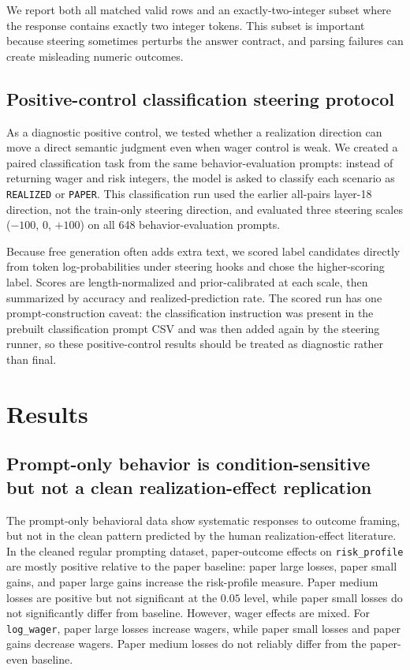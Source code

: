 \documentclass[final]{sparreport}
\begin{document}
We report both all matched valid rows and an exactly-two-integer subset where the response contains exactly two integer tokens. This subset is important because steering sometimes perturbs the answer contract, and parsing failures can create misleading numeric outcomes.

\subsection{Positive-control classification steering protocol}

As a diagnostic positive control, we tested whether a realization direction can move a direct semantic judgment even when wager control is weak. We created a paired classification task from the same behavior-evaluation prompts: instead of returning wager and risk integers, the model is asked to classify each scenario as \texttt{REALIZED} or \texttt{PAPER}. This classification run used the earlier all-pairs layer-18 direction, not the train-only steering direction, and evaluated three steering scales (\(-100\), \(0\), \(+100\)) on all 648 behavior-evaluation prompts.

Because free generation often adds extra text, we scored label candidates directly from token log-probabilities under steering hooks and chose the higher-scoring label. Scores are length-normalized and prior-calibrated at each scale, then summarized by accuracy and realized-prediction rate. The scored run has one prompt-construction caveat: the classification instruction was present in the prebuilt classification prompt CSV and was then added again by the steering runner, so these positive-control results should be treated as diagnostic rather than final.

\section{Results}

\subsection{Prompt-only behavior is condition-sensitive but not a clean realization-effect replication}

The prompt-only behavioral data show systematic responses to outcome framing, but not in the clean pattern predicted by the human realization-effect literature. In the cleaned regular prompting dataset, paper-outcome effects on \texttt{risk\_profile} are mostly positive relative to the paper baseline: paper large losses, paper small gains, and paper large gains increase the risk-profile measure. Paper medium losses are positive but not significant at the \(0.05\) level, while paper small losses do not significantly differ from baseline. However, wager effects are mixed. For \texttt{log\_wager}, paper large losses increase wagers, while paper small losses and paper gains decrease wagers. Paper medium losses do not reliably differ from the paper-even baseline.
\end{document}
